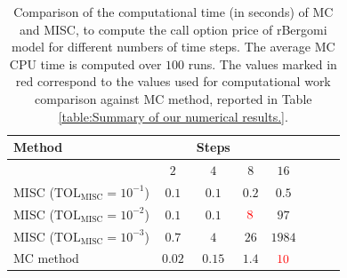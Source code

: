 \FloatBarrier
\begin{table}[h!]
	\centering
	\begin{tabular}{l*{6}{c}r}
	\toprule[1.5pt]
	Method & & Steps  & &     \\
	\hline	
		        & $2$ & $4$ & $8$ & $16$ &   \\
		\hline
		MISC ($\text{TOL}_{\text{MISC}}=10^{-1}$)  & $0.1$ & $0.1$ & $0.2$ & $0.5$ \\
		MISC ($\text{TOL}_{\text{MISC}}=10^{-2}$)  & $0.1$ & $0.1$ & $\red{8}$ & $97$ \\
		MISC ($\text{TOL}_{\text{MISC}}=10^{-3}$)  & $0.7$ & $4$ & $26$ & $1984$ \\
%		
		\hline
		MC method   & $ 0.02
		
		$  & $  0.15$  & $ 1.4$ & $ \red{10}$  \\	
	\bottomrule[1.25pt]
%		
%				
	\end{tabular}
	\caption{Comparison of the computational time (in seconds) of  MC and MISC, to compute the call option price of rBergomi model for different numbers of time steps. The average  MC CPU time is computed over $100$ runs. The values marked in red correspond to the values used for computational work comparison against MC method, reported in Table \ref{table:Summary of our numerical results.}. }
	\label{Comparsion of the computational time of  MC and MISC, used to compute Call option price of rBergomi model for different number of time steps. Case set5}
\end{table}

\FloatBarrier


